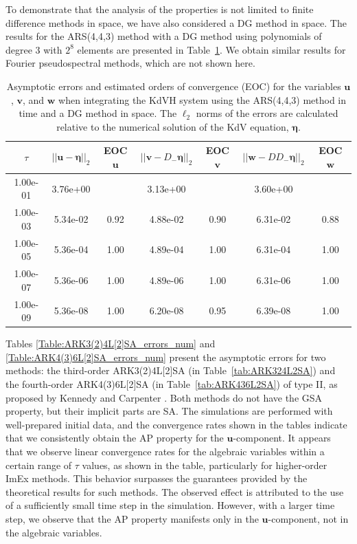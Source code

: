 \documentclass{article}
\newcommand{\ukdv}{\eta}
\begin{document}
To demonstrate that the analysis of the properties is not limited to
finite difference methods in space, we have also considered a DG method
in space. The results for the ARS(4,4,3) method with a DG method using
polynomials of degree $3$ with $2^8$ elements are presented in
Table~\ref{Table:ARS443_DG_errors_num}.
We obtain similar results for Fourier pseudospectral methods,
which are not shown here.

\begin{table}[htbp]
\centering
\caption{Asymptotic errors and estimated orders of convergence (EOC) for the variables $\pmb{u}$, $\pmb{v}$,
 and $\pmb{w}$ when integrating the KdVH system using the ARS(4,4,3) method
 in time and a DG method in space. The $\ell_2$ norms
  of the errors are calculated relative to the numerical solution of the KdV equation, $\pmb{\ukdv}$.}
\label{Table:ARS443_DG_errors_num}
\begin{tabular}{ccccccc}
    \hline
    \hline
    \multicolumn{1}{c}{$\tau$} &
    \multicolumn{1}{c}{$||\pmb{u}-\pmb{\ukdv}||_2$} &
    \multicolumn{1}{c}{EOC $\pmb{u}$} &
    \multicolumn{1}{c}{$||\pmb{v}-D_- \pmb{\ukdv}||_2$} &
    \multicolumn{1}{c}{EOC $\pmb{v}$} &
    \multicolumn{1}{c}{$||\pmb{w}-D D_- \pmb{\ukdv}||_2$} &
    \multicolumn{1}{c}{EOC $\pmb{w}$} \\\hline
    1.00e-01 & 3.76e+00 &  & 3.13e+00 &  & 3.60e+00 &  \\
    1.00e-03 & 5.34e-02 & 0.92 & 4.88e-02 & 0.90 & 6.31e-02 & 0.88 \\
    1.00e-05 & 5.36e-04 & 1.00 & 4.89e-04 & 1.00 & 6.31e-04 & 1.00 \\
    1.00e-07 & 5.36e-06 & 1.00 & 4.89e-06 & 1.00 & 6.31e-06 & 1.00 \\
    1.00e-09 & 5.36e-08 & 1.00 & 6.20e-08 & 0.95 & 6.39e-08 & 1.00 \\
  \end{tabular}
  \end{table}

Tables \ref{Table:ARK3(2)4L[2]SA_errors_num} and \ref{Table:ARK4(3)6L[2]SA_errors_num} present the asymptotic
errors for two methods: the third-order ARK3(2)4L[2]SA (in Table~\ref{tab:ARK324L2SA}) and the fourth-order
ARK4(3)6L[2]SA (in Table~\ref{tab:ARK436L2SA}) of type II,
as proposed by Kennedy and Carpenter \cite{kennedy2003additive}. Both methods do not have the GSA property,
but their implicit parts are SA.
The simulations are performed with well-prepared initial data, and the convergence rates shown in the tables
indicate that we consistently obtain the AP property for the $\pmb{u}$-component. It appears that we observe linear
convergence rates for the algebraic variables within a certain range of $\tau$ values, as shown in the table,
particularly for higher-order ImEx methods. This behavior surpasses the guarantees provided by the
theoretical results for such methods. The observed effect is attributed to the use of a sufficiently
small time step in the simulation. However, with a larger time step,
we observe that the AP property manifests only
in the $\pmb{u}$-component, not in the algebraic variables.
\end{document}
